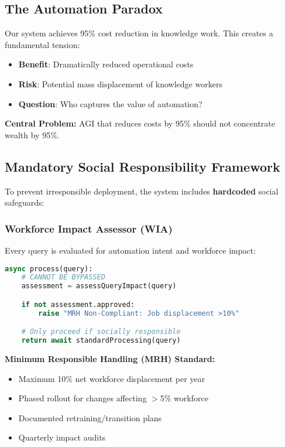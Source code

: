 \documentclass[11pt]{article}
\begin{document}
\subsection{The Automation Paradox}

Our system achieves 95\% cost reduction in knowledge work. This creates a fundamental tension:

\begin{itemize}
    \item \textbf{Benefit}: Dramatically reduced operational costs
    \item \textbf{Risk}: Potential mass displacement of knowledge workers
    \item \textbf{Question}: Who captures the value of automation?
\end{itemize}

\textbf{Central Problem:} AGI that reduces costs by 95\% should not concentrate wealth by 95\%.

\subsection{Mandatory Social Responsibility Framework}

To prevent irresponsible deployment, the system includes \textbf{hardcoded} social safeguards:

\subsubsection{Workforce Impact Assessor (WIA)}

Every query is evaluated for automation intent and workforce impact:

\begin{lstlisting}[language=Python, caption=Mandatory WIA Check]
async process(query):
    # CANNOT BE BYPASSED
    assessment = assessQueryImpact(query)

    if not assessment.approved:
        raise "MRH Non-Compliant: Job displacement >10%"

    # Only proceed if socially responsible
    return await standardProcessing(query)
\end{lstlisting}

\textbf{Minimum Responsible Handling (MRH) Standard:}
\begin{itemize}
    \item Maximum 10\% net workforce displacement per year
    \item Phased rollout for changes affecting $>$5\% workforce
    \item Documented retraining/transition plans
    \item Quarterly impact audits
\end{itemize}
\end{document}
